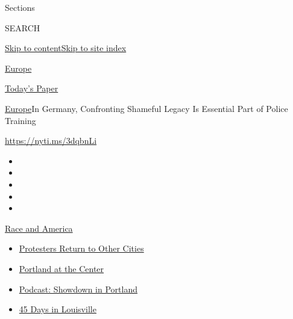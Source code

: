 Sections

SEARCH

\protect\hyperlink{site-content}{Skip to
content}\protect\hyperlink{site-index}{Skip to site index}

\href{https://www.nytimes.com/section/world/europe}{Europe}

\href{https://myaccount.nytimes.com/auth/login?response_type=cookie\&client_id=vi}{}

\href{https://www.nytimes.com/section/todayspaper}{Today's Paper}

\href{/section/world/europe}{Europe}\textbar{}In Germany, Confronting
Shameful Legacy Is Essential Part of Police Training

\url{https://nyti.ms/3dqbnLi}

\begin{itemize}
\item
\item
\item
\item
\item
\end{itemize}

\href{https://www.nytimes.com/news-event/george-floyd-protests-minneapolis-new-york-los-angeles?action=click\&pgtype=Article\&state=default\&region=TOP_BANNER\&context=storylines_menu}{Race
and America}

\begin{itemize}
\tightlist
\item
  \href{https://www.nytimes.com/2020/07/26/us/protests-portland-seattle-trump.html?action=click\&pgtype=Article\&state=default\&region=TOP_BANNER\&context=storylines_menu}{Protesters
  Return to Other Cities}
\item
  \href{https://www.nytimes.com/2020/07/24/us/portland-oregon-protests-white-race.html?action=click\&pgtype=Article\&state=default\&region=TOP_BANNER\&context=storylines_menu}{Portland
  at the Center}
\item
  \href{https://www.nytimes.com/2020/07/23/podcasts/the-daily/portland-protests.html?action=click\&pgtype=Article\&state=default\&region=TOP_BANNER\&context=storylines_menu}{Podcast:
  Showdown in Portland}
\item
  \href{https://www.nytimes.com/interactive/2020/07/16/us/black-lives-matter-protests-louisville-breonna-taylor.html?action=click\&pgtype=Article\&state=default\&region=TOP_BANNER\&context=storylines_menu}{45
  Days in Louisville}
\end{itemize}

